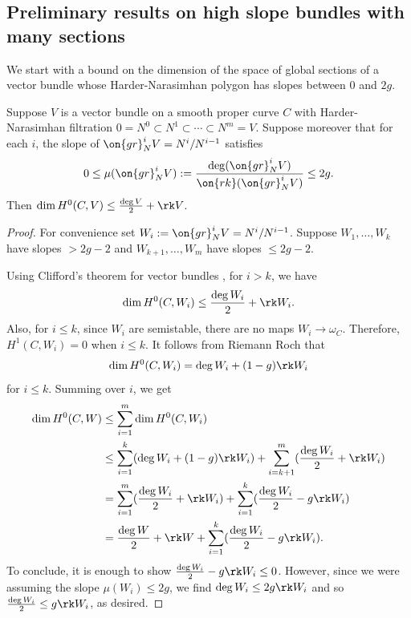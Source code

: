 \subsection{Preliminary results on high slope bundles with many sections}
\label{subsection:high-slope-lemmas}
We start with a bound on the dimension of the space of global sections of a vector bundle
whose Harder-Narasimhan polygon has slopes between $0$ and $2g$.
\begin{lemma}
\notready
	\label{lemma:cohomology-bound}
	Suppose $V$ is a vector bundle on a smooth proper curve $C$ with Harder-Narasimhan filtration $0 = N^0 \subset N^1 \subset \cdots \subset N^m = V$. Suppose moreover that for each $i$, the slope of $\on{gr}^i_{N} V=N^i/N^{i-1}$
	satisfies $$0\leq \mu(\on{gr}^i_{N} V):=\frac{\deg(\on{gr}^i_{N}V)}{\on{rk}(\on{gr}^i_{N}V)}\leq 2g.$$
	Then $\dim H^0(C, V) \leq \frac{\deg V}{2} + \rk V$.
\end{lemma}
\begin{proof}
	For convenience set $W_i := \on{gr}^i_{N}V=N^i/N^{i-1}$.
Suppose $W_1, \ldots, W_k$ have slopes $> 2g-2$ and $W_{k+1}, \ldots,
	W_m$ have slopes $\leq 2g-2$.

	Using Clifford's theorem for vector bundles
	\cite[Theorem 2.1]{brambila-pazGN:geography-of-brill-noether-loci},
	for $i > k$,
	we have
	\begin{align*}
	\dim H^0(C, W_i)
	\leq \frac{\deg W_i}{2} + \rk W_i.
	\end{align*}
	Also, for $i \leq k$, since $W_i$ are semistable, there are no maps $W_i \to
	\omega_C$.
	Therefore, $H^1(C, W_i) = 0$ when $i \leq k$.
	It follows from Riemann Roch that
	\begin{align*}
	\dim H^0(C, W_i) = \deg W_i + (1-g) \rk W_i
	\end{align*}
	for $i \leq k$.
	Summing over $i$, we get
	\begin{align*}
		\dim H^0(C, W) &\leq \sum_{i=1}^m \dim H^0(C, W_i) \\
		&\leq \sum_{i=1}^k (\deg W_i + (1-g) \rk W_i)
+ \sum_{i=k+1}^m (\frac{\deg
	W_i}{2} + \rk W_i) \\
		&= \sum_{i=1}^m (\frac{\deg W_i}{2} + \rk W_i)
		+ \sum_{i=1}^k (\frac{\deg W_i}{2} -g \rk W_i) \\
		&= \frac{\deg W}{2} + \rk W+ \sum_{i=1}^k (\frac{\deg W_i}{2} -g \rk
		W_i).
	\end{align*}
	To conclude, it is enough to show
	$\frac{\deg W_i}{2} -g \rk W_i \le 0$.
	However, since we were assuming the slope $\mu(W_i) \leq 2g$, we find
	$\deg W_i \leq 2g \rk W_i$ and so $\frac{\deg W_i}{2} \leq g \rk W_i$,
	as desired.
\end{proof}

